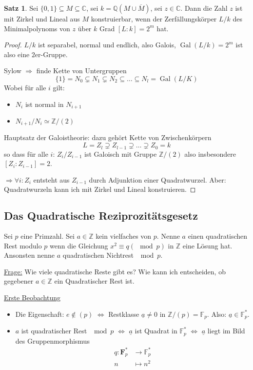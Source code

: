 \documentclass[12pt,parskip=full]{scrartcl}
\newcommand{\setZ}{\mathbb{Z}}
\newcommand{\setQ}{\mathbb{Q}}
\newcommand{\setC}{\mathbb{C}}
\newcommand{\heading}{\underline}
\DeclareMathOperator{\Gal}{Gal}
\theoremstyle{definition}
\newtheorem{theorem}{Satz}[section]
\theoremstyle{remark}
\begin{document}
	\begin{theorem}
		Sei $\{ 0,1 \} \subseteq M \subseteq \setC$, sei $k = \setQ(M \cup \overline{M})$, sei $z \in \setC$. Dann die Zahl $z$ ist mit Zirkel und Lineal aus $M$ konstruierbar, wenn der Zerfällungskörper $L/k$ des Minimalpolynoms von $z$ über $k$ Grad $[L:k] = 2^m$ hat.
	\end{theorem}

	\begin{proof}
		$L/k$ ist separabel, normal und endlich, also Galois, $\Gal(L/k) = 2^m$ ist also eine $2$er-Gruppe.
		
		Sylow $\Rightarrow$ finde Kette von Untergruppen
		\begin{equation*}
			\{ 1 \} = N_0 \subsetneq N_1 \subsetneq N_2 \subseteq \dots \subseteq N_l = \Gal(L/K)
		\end{equation*}
		Wobei für alle $i$ gilt:
		\begin{itemize}
			\item $N_i$ ist normal in $N_{i+1}$
			\item $N_{i+1}/N_i \simeq \setZ/(2)$
		\end{itemize}
		Hauptsatz der Galoistheorie: dazu gehört Kette von Zwischenkörpern
		\begin{equation*}
			L = Z_l \supsetneq Z_{l-1} \supsetneq \dots \supsetneq Z_0 = k
		\end{equation*}
		so dass für alle $i$: $Z_i/Z_{i-1}$ ist Galoisch mit Gruppe $\setZ/(2)$ also insbesondere $[Z_i : Z_{i-1}] = 2$.
		
		$\Rightarrow \forall i: Z_i$ entsteht aus $Z_{i-1}$ durch Adjunktion einer Quadratwurzel. Aber: Quadratwurzeln kann ich mit Zirkel und Lineal konstruieren.
	\end{proof}

	\subsection{Das Quadratische Reziprozitätsgesetz}
	
	Sei $p$ eine Primzahl. Sei $a \in \setZ$ kein vielfaches von $p$. Nenne $a$ einen quadratischen Rest modulo $p$ wenn die Gleichung $x^2 \equiv q (\mod p)$ in $\setZ$ eine Lösung hat. Ansonsten nenne $a$ quadratischen Nichtrest $\mod p$.
	
	\heading{Frage:} Wie viele quadratische Reste gibt es? Wie kann ich entscheiden, ob gegebener $a \in \setZ$ ein Quadratischer Rest ist.
	
	\heading{Erste Beobachtung}
	\begin{itemize}
		\item Die Eigenschaft: $e \notin (p)$ $\Leftrightarrow$ Restklasse $\underline{a} \neq 0$ in $\setZ / (p) = \mathbb{F}_p$. Also: $\underline{a} \in \mathbb{F}_p^*$.
		\item $a$ ist quadratischer Rest $\mod p$ $\Leftrightarrow$ $\underline{a}$ ist Quadrat in $\mathbb{F}_p^*$ $\Leftrightarrow$ $\underline{a}$ liegt im Bild des Gruppenmorphismus
		\begin{align*}
			q: \mathbf{F}_p^* &\longrightarrow \mathbb{F}_p^* \\
			n &\longmapsto n^2
		\end{align*}
	\end{itemize}
\end{document}

